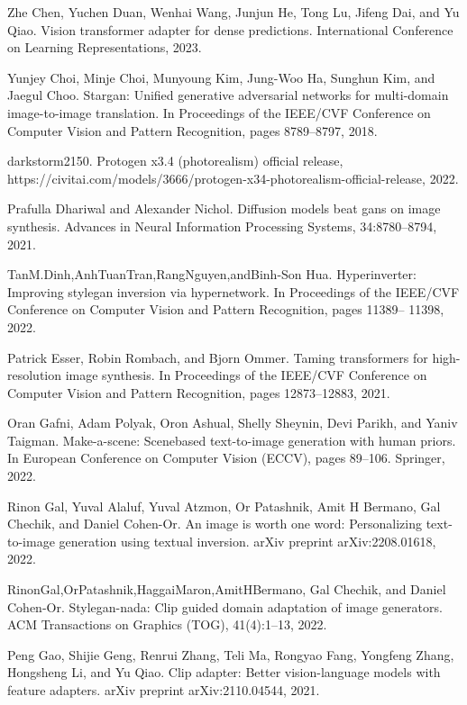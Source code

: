 \documentclass[a4paper,AutoFakeBold,oneside,12pt]{book}
\begin{document}
\begin{nopagenumber}
\noindent
[14] Zhe Chen, Yuchen Duan, Wenhai Wang, Junjun He, Tong Lu, Jifeng Dai, and Yu Qiao. Vision transformer adapter for dense predictions. International Conference on Learning Representations, 2023.

\noindent
[15] Yunjey Choi, Minje Choi, Munyoung Kim, Jung-Woo Ha, Sunghun Kim, and Jaegul Choo. Stargan: Unified generative adversarial networks for multi-domain image-to-image translation. In Proceedings of the IEEE/CVF Conference on Computer Vision and Pattern Recognition, pages 8789–8797, 2018.

\noindent
[16] darkstorm2150. Protogen x3.4 (photorealism) official release, https://civitai.com/models/3666/protogen-x34-photorealism-official-release, 2022.

\noindent
[17] Prafulla Dhariwal and Alexander Nichol. Diffusion models beat gans on image synthesis. Advances in Neural Information Processing Systems, 34:8780–8794, 2021.

\noindent
[18] TanM.Dinh,AnhTuanTran,RangNguyen,andBinh-Son Hua. Hyperinverter: Improving stylegan inversion via hypernetwork. In Proceedings of the IEEE/CVF Conference on Computer Vision and Pattern Recognition, pages 11389– 11398, 2022.

\noindent
[19] Patrick Esser, Robin Rombach, and Bjorn Ommer. Taming transformers for high-resolution image synthesis. In Proceedings of the IEEE/CVF Conference on Computer Vision and Pattern Recognition, pages 12873–12883, 2021.

\noindent
[20] Oran Gafni, Adam Polyak, Oron Ashual, Shelly Sheynin, Devi Parikh, and Yaniv Taigman. Make-a-scene: Scenebased text-to-image generation with human priors. In European Conference on Computer Vision (ECCV), pages 89–106. Springer, 2022.

\noindent
[21] Rinon Gal, Yuval Alaluf, Yuval Atzmon, Or Patashnik, Amit H Bermano, Gal Chechik, and Daniel Cohen-Or. An image is worth one word: Personalizing text-to-image generation using textual inversion. arXiv preprint arXiv:2208.01618, 2022.

\noindent
[22] RinonGal,OrPatashnik,HaggaiMaron,AmitHBermano, Gal Chechik, and Daniel Cohen-Or. Stylegan-nada: Clip guided domain adaptation of image generators. ACM Transactions on Graphics (TOG), 41(4):1–13, 2022.

\noindent
[23] Peng Gao, Shijie Geng, Renrui Zhang, Teli Ma, Rongyao Fang, Yongfeng Zhang, Hongsheng Li, and Yu Qiao. Clip adapter: Better vision-language models with feature adapters. arXiv preprint arXiv:2110.04544, 2021.


\end{nopagenumber}
\end{document}
